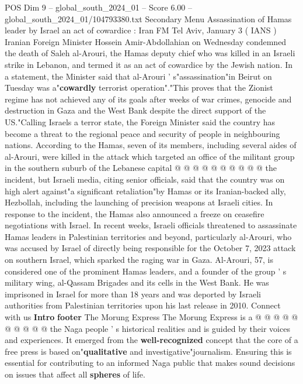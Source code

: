 \begin{textsample}{POS Dim 9 – global\_south\_2024\_01 – Score 6.00 – global\_south\_2024\_01/104793380.txt}  \label{ex:f9_pos_061}
Secondary Menu Assassination of Hamas leader by Israel an act of cowardice : Iran FM Tel Aviv, January 3 ( IANS ) Iranian Foreign Minister Hossein Amir-Abdollahian on Wednesday condemned the death of Saleh al-Arouri, the Hamas deputy chief who was killed in an Israeli strike in Lebanon, and termed it as an act of cowardice by the Jewish nation.
In a statement, the Minister said that al-Arouri ' s"assassination"in Beirut on Tuesday was a"\textbf{cowardly} terrorist operation"."This proves that the Zionist regime has not achieved any of its goals after weeks of war crimes, genocide and destruction in Gaza and the West Bank despite the direct support of the US."Calling Israels a terror state, the Foreign Minister said the country has become a threat to the regional peace and security of people in neighbouring nations.
According to the Hamas, seven of its members, including several aides of al-Arouri, were killed in the attack which targeted an office of the militant group in the southern suburb of the Lebanese capital @ @ @ @ @ @ @ @ @ @ the incident, but Israeli media, citing senior officials, said that the country was on high alert against"a significant retaliation"by Hamas or its Iranian-backed ally, Hezbollah, including the launching of precision weapons at Israeli cities.
In response to the incident, the Hamas also announced a freeze on ceasefire negotiations with Israel.
In recent weeks, Israeli officials threatened to assassinate Hamas leaders in Palestinian territories and beyond, particularly al-Arouri, who was accused by Israel of directly being responsible for the October 7, 2023 attack on southern Israel, which sparked the raging war in Gaza.
Al-Arouri, 57, is considered one of the prominent Hamas leaders, and a founder of the group ' s military wing, al-Qassam Brigades and its cells in the West Bank.
He was imprisoned in Israel for more than 18 years and was deported by Israeli authorities from Palestinian territories upon his last release in 2010.
Connect with us \textbf{Intro} \textbf{footer} The Morung Express The Morung Express is a @ @ @ @ @ @ @ @ @ @ the Naga people ' s historical realities and is guided by their voices and experiences.
It emerged from the \textbf{well-recognized} concept that the core of a free press is based on"\textbf{qualitative} and investigative"journalism.
Ensuring this is essential for contributing to an informed Naga public that makes sound decisions on issues that affect all \textbf{spheres} of life.

\end{textsample}
